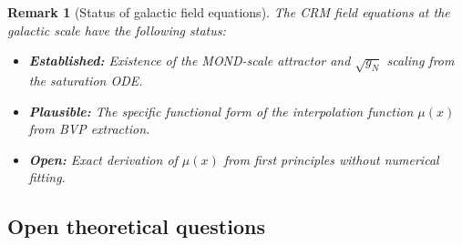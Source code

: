 \documentclass[aps,prd,twocolumn,superscriptaddress,nofootinbib]{revtex4-2}
\newtheorem{remark}{Remark}
\begin{document}
\begin{remark}[Status of galactic field equations]
The CRM field equations at the galactic scale have the following status:
\begin{itemize}
\item \textbf{Established:} Existence of the MOND-scale attractor and $\sqrt{g_N}$ scaling from the saturation ODE.
\item \textbf{Plausible:} The specific functional form of the interpolation function $\mu(x)$ from BVP extraction.
\item \textbf{Open:} Exact derivation of $\mu(x)$ from first principles without numerical fitting.
\end{itemize}
\end{remark}

\subsection{Open theoretical questions}
\end{document}
